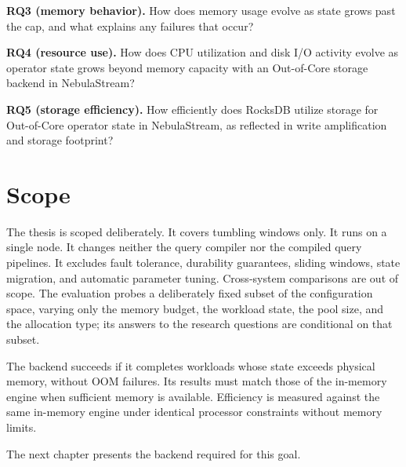 \textbf{RQ3 (memory behavior).}
How does memory usage evolve as state grows past the cap, and what explains any failures that occur?

\textbf{RQ4 (resource use).}
How does CPU utilization and disk I/O activity evolve as operator state grows beyond memory capacity with an Out-of-Core storage backend in NebulaStream?

\textbf{RQ5 (storage efficiency).}
How efficiently does RocksDB utilize storage for Out-of-Core operator state in NebulaStream, as reflected in write amplification and storage footprint?


\section{Scope\label{sec:scope}}

The thesis is scoped deliberately.
It covers tumbling windows only.
It runs on a single node.
It changes neither the query compiler nor the compiled query pipelines.
It excludes fault tolerance, durability guarantees, sliding windows, state migration, and automatic parameter tuning.
Cross-system comparisons are out of scope.
The evaluation probes a deliberately fixed subset of the configuration space, varying only the memory budget, the workload state, the pool size, and the allocation type; its answers to the research questions are conditional on that subset.

The backend succeeds if it completes workloads whose state exceeds physical memory, without OOM failures.
Its results must match those of the in-memory engine when sufficient memory is available.
Efficiency is measured against the same in-memory engine under identical processor constraints without memory limits.

The next chapter presents the backend required for this goal.
